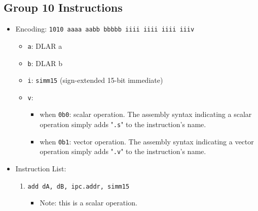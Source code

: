 \documentclass{article}
\begin{document}
	\subsection{Group 10 Instructions}
		\begin{itemize}
		\item Encoding: \texttt{1010 aaaa aabb bbbbb  iiii iiii iiii iiiv}
			\begin{itemize}
			\item \texttt{a}: DLAR a
			\item \texttt{b}: DLAR b
			\item \texttt{i}: \texttt{simm15} (sign-extended 15-bit
				immediate)
			\item \texttt{v}:
				\begin{itemize}
				\item when \texttt{0b0}: scalar operation. The assembly
					syntax indicating a scalar operation simply adds
					"\texttt{.s}" to the instruction's name.
				\item when \texttt{0b1}: vector operation. The assembly
					syntax indicating a vector operation simply adds
					"\texttt{.v}" to the instruction's name.
				\end{itemize}
			\end{itemize}
		\item Instruction List:
			\begin{enumerate}
			\item \texttt{add dA, dB, ipc.addr, simm15}
				\begin{itemize}
				\item Note: this is a scalar operation.
				\end{itemize}
			\end{enumerate}
		\end{itemize}



\end{document}
